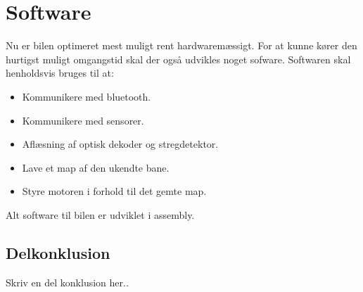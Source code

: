 
\section{Software}
Nu er bilen optimeret mest muligt rent hardwaremæssigt. For at kunne kører den hurtigst muligt omgangstid skal der også udvikles noget sofware. Softwaren skal henholdsvis bruges til at:
\begin{itemize}
\item Kommunikere med bluetooth.
\item Kommunikere med sensorer.
\item Aflæsning af optisk dekoder og stregdetektor.
\item Lave et map af den ukendte bane.
\item Styre motoren i forhold til det gemte map.
\end{itemize}
Alt software til bilen er udviklet i assembly.











\subsection{Delkonklusion}
Skriv en del konklusion her..